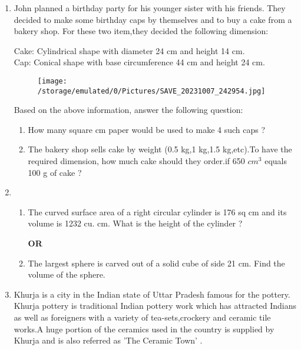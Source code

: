 \documentclass[12pt]{article}
\begin{document}
\begin{enumerate}
            \item John planned a birthday party for his younger sister with his friends. They decided to make some birthday caps by themselves and to buy a cake from a bakery shop. For these two item,they decided the following dimension:
           
            Cake: Cylindrical shape with diameter 24 cm and height 14 cm.\\
            Cap: Conical shape with base circumference 44 cm and height 24 cm.\\
           \begin{figure}[H]
                \centering
                \texttt{[image: /storage/emulated/0/Pictures/SAVE\_20231007\_242954.jpg]}
                \caption{}
                \label{SAVE_20231007_242954}
            \end{figure}
             Based on the above information, answer the following question:
       \begin{enumerate}
          \item How many square cm paper would be used to make 4 such caps ?
          \item  The bakery shop sells cake by weight (0.5 kg,1 kg,1.5 kg,etc).To have the required dimension, how much cake should they order.if 650 $cm^3$  equals 100 g of cake ?
            \end{enumerate}
              \item \begin{enumerate}
          \item The curved surface area of a right circular cylinder is 176 sq cm and its volume is 1232 cu. cm. What is the  height of the cylinder ?
             \begin{center}
             \textbf{OR}
             \end{center}
             \item The largest sphere is carved out of a solid cube of side 21 cm. Find the volume of the sphere.
        \end{enumerate}
       
         
        \item Khurja is a city in the Indian state of Uttar Pradesh famous for the pottery. Khurja pottery is traditional Indian pottery work which has attracted Indians as well as foreigners with a variety of tea-sets,crockery and ceramic tile works.A huge portion of the ceramics used in the country is supplied by Khurja and is also referred as 'The Ceramic Town' .\\


\end{enumerate}
\end{document}
